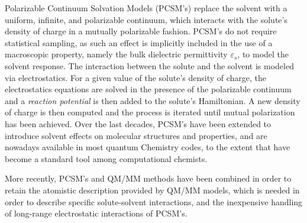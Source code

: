 \documentclass[aip,jcp,a4paper,11pt]{revtex4-1}
\begin{document}
Polarizable Continuum Solvation Models\cite{MST,ReviewPCM_1994,ReviewPCM_2005,Orozco_CR_Solvent00,Klamt:2011we,Mennucci:2012ct,honig1995cla,Roux:1999vp} (PCSM's) replace the solvent with a uniform, infinite, and polarizable continuum, which interacts with the solute's density of charge in a mutually polarizable fashion. PCSM's do not require statistical sampling, as such an effect is implicitly included in the use of a macroscopic property, namely the bulk dielectric permittivity $\varepsilon_s$, to model the solvent response. The interaction between the solute and the solvent is modeled via electrostatics. For a given value of the solute's density of charge, the electrostatics equations are solved in the presence of the polarizable continuum and a \emph{reaction potential} is then added to the solute's Hamiltonian. A new density of charge is then computed and the process is iterated until mutual polarization has been achieved\cite{ReviewPCM_2005,Lipparini_JCP_VPCM,Lipparini_JCTC_VPCMSCF,Lipparini_JCP_Perspective}.
Over the last decades, PCSM's have been extended to introduce solvent effects on molecular structures and properties\cite{Tomasi_PCCP_PCMProps,Mennucci_Chir_PCMProps,Mennucci_JPCL_PCM}, and are nowadays available in most quantum Chemistry codes, to the extent that have become a standard tool among computational chemists. 

More recently, PCSM's and QM/MM methods have been combined\cite{Pedone_CPC_QMMMPCM,Rega_JACS_QMMMPCM,Vreven_JCP_OniomPCM,Bandyopadhyay2002,Lipparini_JCTC_FQPCM,Caprasecca_JCTC_FMM,Steindal_JCPA_QMMMPCM,Boulanger_JCTC_QMMMPolPCM,Caprasecca_JCTC_QMMMPolPCM} in order to retain the atomistic description provided by QM/MM models, which is needed in order to describe specific solute-solvent interactions, and the inexpensive handling of long-range electrostatic interactions of PCSM's.
\end{document}
